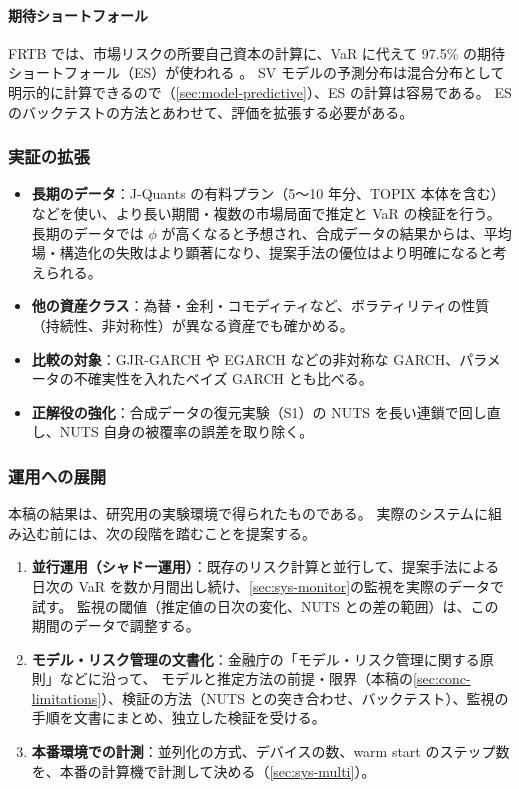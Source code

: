 \paragraph{期待ショートフォール}
FRTB では、市場リスクの所要自己資本の計算に、VaR に代えて 97.5\% の期待ショートフォール（ES）が使われる \parencite{bcbs2019}。
SV モデルの予測分布は混合分布として明示的に計算できるので（\cref{sec:model-predictive}）、ES の計算は容易である。
ES のバックテストの方法とあわせて、評価を拡張する必要がある。

\subsubsection{実証の拡張}

\begin{itemize}
  \item \textbf{長期のデータ}：J-Quants の有料プラン（5〜10 年分、TOPIX 本体を含む）などを使い、より長い期間・複数の市場局面で推定と VaR の検証を行う。
    長期のデータでは $\phi$ が高くなると予想され、合成データの結果からは、平均場・構造化の失敗はより顕著になり、提案手法の優位はより明確になると考えられる。
  \item \textbf{他の資産クラス}：為替・金利・コモディティなど、ボラティリティの性質（持続性、非対称性）が異なる資産でも確かめる。
  \item \textbf{比較の対象}：GJR-GARCH \parencite{glosten1993}や EGARCH \parencite{nelson1991}などの非対称な GARCH、パラメータの不確実性を入れたベイズ GARCH とも比べる。
  \item \textbf{正解役の強化}：合成データの復元実験（S1）の NUTS を長い連鎖で回し直し、NUTS 自身の被覆率の誤差を取り除く。
\end{itemize}

\subsubsection{運用への展開}

本稿の結果は、研究用の実験環境で得られたものである。
実際のシステムに組み込む前には、次の段階を踏むことを提案する。

\begin{enumerate}
  \item \textbf{並行運用（シャドー運用）}：既存のリスク計算と並行して、提案手法による日次の VaR を数か月間出し続け、\cref{sec:sys-monitor}の監視を実際のデータで試す。
    監視の閾値（推定値の日次の変化、NUTS との差の範囲）は、この期間のデータで調整する。
  \item \textbf{モデル・リスク管理の文書化}：金融庁の「モデル・リスク管理に関する原則」\parencite{fsa2021mrm}などに沿って、
    モデルと推定方法の前提・限界（本稿の\cref{sec:conc-limitations}）、検証の方法（NUTS との突き合わせ、バックテスト）、監視の手順を文書にまとめ、独立した検証を受ける。
  \item \textbf{本番環境での計測}：並列化の方式、デバイスの数、warm start のステップ数を、本番の計算機で計測して決める（\cref{sec:sys-multi}）。
\end{enumerate}

